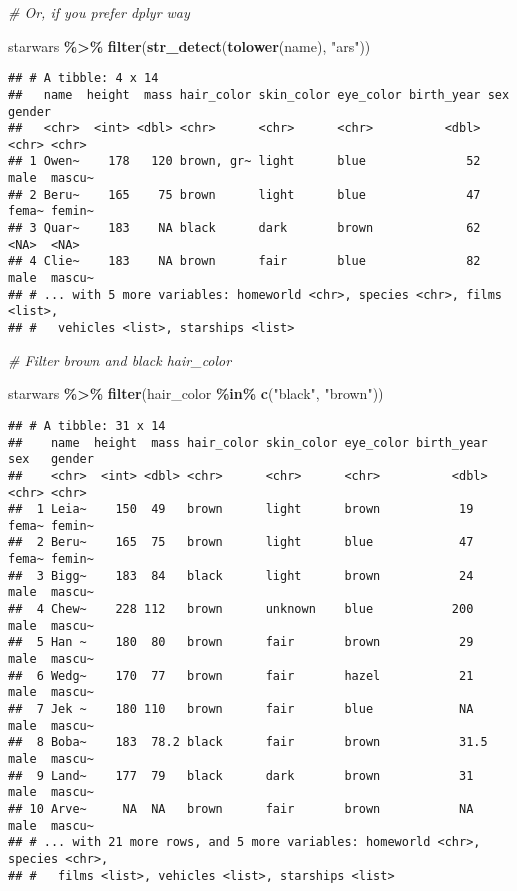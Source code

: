 \documentclass[
]{book}
\newenvironment{Shaded}{\begin{snugshade}}{\end{snugshade}}
\newcommand{\CommentTok}[1]{\textcolor[rgb]{0.56,0.35,0.01}{\textit{#1}}}
\newcommand{\KeywordTok}[1]{\textcolor[rgb]{0.13,0.29,0.53}{\textbf{#1}}}
\newcommand{\NormalTok}[1]{#1}
\newcommand{\OperatorTok}[1]{\textcolor[rgb]{0.81,0.36,0.00}{\textbf{#1}}}
\newcommand{\StringTok}[1]{\textcolor[rgb]{0.31,0.60,0.02}{#1}}
\begin{document}
\begin{Shaded}
\begin{Highlighting}[]
\CommentTok{\# Or, if you prefer dplyr way}

\NormalTok{starwars }\OperatorTok{\%\textgreater{}\%}
\StringTok{  }\KeywordTok{filter}\NormalTok{(}\KeywordTok{str\_detect}\NormalTok{(}\KeywordTok{tolower}\NormalTok{(name), }\StringTok{"ars"}\NormalTok{))}
\end{Highlighting}
\end{Shaded}

\begin{verbatim}
## # A tibble: 4 x 14
##   name  height  mass hair_color skin_color eye_color birth_year sex   gender
##   <chr>  <int> <dbl> <chr>      <chr>      <chr>          <dbl> <chr> <chr> 
## 1 Owen~    178   120 brown, gr~ light      blue              52 male  mascu~
## 2 Beru~    165    75 brown      light      blue              47 fema~ femin~
## 3 Quar~    183    NA black      dark       brown             62 <NA>  <NA>  
## 4 Clie~    183    NA brown      fair       blue              82 male  mascu~
## # ... with 5 more variables: homeworld <chr>, species <chr>, films <list>,
## #   vehicles <list>, starships <list>
\end{verbatim}

\begin{Shaded}
\begin{Highlighting}[]
\CommentTok{\# Filter brown and black hair\_color}

\NormalTok{starwars }\OperatorTok{\%\textgreater{}\%}
\StringTok{  }\KeywordTok{filter}\NormalTok{(hair\_color }\OperatorTok{\%in\%}\StringTok{ }\KeywordTok{c}\NormalTok{(}\StringTok{"black"}\NormalTok{, }\StringTok{"brown"}\NormalTok{))}
\end{Highlighting}
\end{Shaded}

\begin{verbatim}
## # A tibble: 31 x 14
##    name  height  mass hair_color skin_color eye_color birth_year sex   gender
##    <chr>  <int> <dbl> <chr>      <chr>      <chr>          <dbl> <chr> <chr> 
##  1 Leia~    150  49   brown      light      brown           19   fema~ femin~
##  2 Beru~    165  75   brown      light      blue            47   fema~ femin~
##  3 Bigg~    183  84   black      light      brown           24   male  mascu~
##  4 Chew~    228 112   brown      unknown    blue           200   male  mascu~
##  5 Han ~    180  80   brown      fair       brown           29   male  mascu~
##  6 Wedg~    170  77   brown      fair       hazel           21   male  mascu~
##  7 Jek ~    180 110   brown      fair       blue            NA   male  mascu~
##  8 Boba~    183  78.2 black      fair       brown           31.5 male  mascu~
##  9 Land~    177  79   black      dark       brown           31   male  mascu~
## 10 Arve~     NA  NA   brown      fair       brown           NA   male  mascu~
## # ... with 21 more rows, and 5 more variables: homeworld <chr>, species <chr>,
## #   films <list>, vehicles <list>, starships <list>
\end{verbatim}
\end{document}
